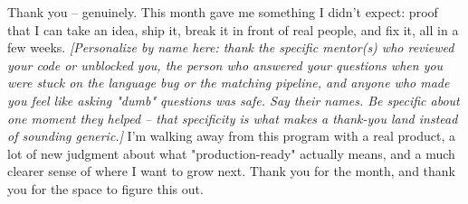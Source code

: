 \documentclass[11pt]{article}
\begin{document}
\begin{scriptbox}
Thank you -- genuinely. This month gave me something I didn't expect: proof that I can
take an idea, ship it, break it in front of real people, and fix it, all in a few weeks.
\textit{[Personalize by name here: thank the specific mentor(s) who reviewed your code
or unblocked you, the person who answered your questions when you were stuck on the
language bug or the matching pipeline, and anyone who made you feel like asking
"dumb" questions was safe. Say their names. Be specific about one moment they helped --
that specificity is what makes a thank-you land instead of sounding generic.]}
I'm walking away from this program with a real product, a lot of new judgment about
what "production-ready" actually means, and a much clearer sense of where I want to
grow next. Thank you for the month, and thank you for the space to figure this out.
\end{scriptbox}
\end{document}
